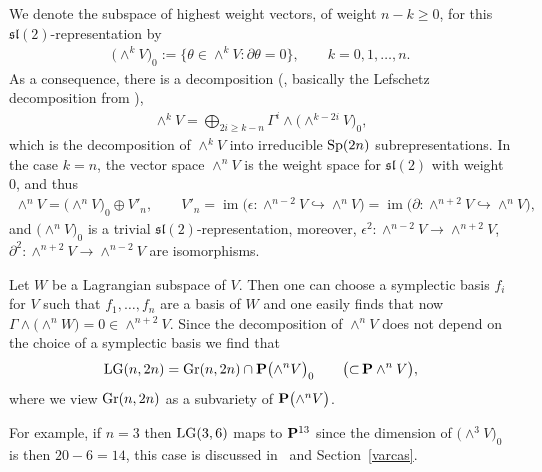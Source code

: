 \documentclass[pdftex]{sigma}
\newcommand{\PP}{{\bf P}}
\newcommand{\im}{\operatorname{im}}
\numberwithin{equation}{section}
\begin{document}
We denote the subspace of highest weight vectors, of weight $n-k\geq 0$, for this ${\mathfrak{sl}}(2)$-representation by
\begin{gather*}
\big({\wedge}^kV\big)_0 := \big\{ \theta\in\wedge^kV\colon \partial\theta = 0 \big\},\qquad k = 0,1,\ldots,n.
\end{gather*}
As a consequence, there is a decomposition (\cite[Section~11.6.7, Theorem~3]{P}, basically the Lefschetz decomposition from \cite[p.~122]{GH}),
\begin{gather*}
\wedge^kV = \bigoplus_{2i\geq k-n} \Gamma^i\wedge\big({\wedge}^{k-2i}V\big)_0,
\end{gather*}
which is the decomposition of $\wedge^kV$ into irreducible ${\rm Sp}(2n)$ subrepresentations. In the case $k=n$, the vector space $\wedge^nV$ is the weight space for ${\mathfrak{sl}}(2)$ with weight $0$, and thus
\begin{gather*}
\wedge^nV = \big({\wedge}^nV\big)_0\oplus V'_n, \qquad V'_n=\im\big(\epsilon\colon \wedge^{n-2}V\hookrightarrow\wedge^nV\big) = \im\big(\partial\colon \wedge^{n+2}V\hookrightarrow\wedge^{n}V\big),
\end{gather*}
and $\big({\wedge}^nV\big)_0$ is a trivial ${\mathfrak{sl}}(2)$-representation, moreover, $\epsilon^2\colon \wedge^{n-2}V\rightarrow\wedge^{n+2}V$, $\partial^2\colon \wedge^{n+2}V\rightarrow\wedge^{n-2}V$ are isomorphisms.

Let $W$ be a Lagrangian subspace of $V$. Then one can choose a symplectic basis $f_i$ for $V$ such that $f_1,\ldots,f_n$ are a basis of $W$ and one easily finds that now
$\Gamma\wedge\big({\wedge}^nW\big)=0\in \wedge^{n+2}V$. Since the decomposition of $\wedge^nV$ does not depend on the choice of a symplectic basis we find that
\begin{gather*}
{\rm LG}(n,2n) = {\rm Gr}(n,2n) \cap \PP\big({\wedge}^n V\big)_0\qquad\big({\subset} \,\PP \wedge^n V\big),
\end{gather*}
where we view ${\rm Gr}(n,2n)$ as a subvariety of $\PP\big({\wedge}^n V\big)$.

For example, if $n=3$ then ${\rm LG}(3,6)$ maps to $\PP^{13}$ since the dimension of $\big({\wedge}^3V\big)_0$ is then $20-6=14$, this case is discussed in~\cite{IR} and Section~\ref{varcas}.
\end{document}
